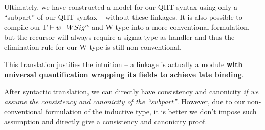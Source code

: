 Ultimately, we have constructed a model for our QIIT-syntax using only a
``subpart'' of our QIIT-syntax -- without these linkages. It is also
possible to compile our ${ {\Gamma} \vdash {w} \ \ WSig^{n} }$ and W-type into a more
conventional formulation, but the recursor will always require a sigma
type as handler and thus the elimination rule for our W-type is still
non-conventional.

This translation justifies the intuition -- a linkage is actually a
module \textbf{with universal quantification wrapping its fields to
achieve late binding}. 

After syntactic translation, we can directly have consistency and
canonicity \textit{if we assume the consistency and canonicity of the
``subpart''}. However, due to our non-conventional formulation of the
inductive type, it is better we don't impose such assumption and
directly give a consistency and canonicity proof.

